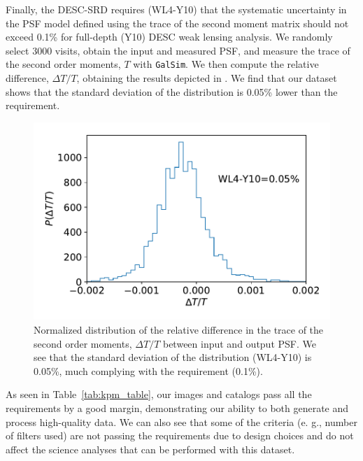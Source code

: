 \documentclass[twocolumn]{aastex62}
\begin{document}
Finally, the DESC-SRD requires (WL4-Y10) that the systematic uncertainty in the PSF model defined using the trace of the second moment matrix should not exceed 0.1\% for full-depth (Y10) DESC weak lensing analysis. We randomly select 3000 visits, obtain the input and measured PSF, and measure the trace of the second order moments, $T$ with \texttt{GalSim}. We then compute the relative difference, $\Delta T/T$, obtaining the results depicted in . We find that our dataset shows that the standard deviation of the distribution is 0.05\% lower than the requirement.
\begin{figure}
\centering
\includegraphics[width=0.9\columnwidth]{WL4-Y10}
\caption{Normalized distribution of the relative difference in the trace of the second order moments, $\Delta T/T$ between input and output PSF. We see that the standard deviation of the distribution (WL4-Y10) is 0.05\%, much complying with the requirement (0.1\%).}
\label{fig:WL4-Y10}
\end{figure}

As seen in Table~\ref{tab:kpm_table}, our images and catalogs pass all the requirements by a good margin, demonstrating our ability to both generate and process high-quality data. We can also see that some of the criteria (e. g., number of filters used) are not passing the requirements due to design choices and do not affect the science analyses that can be performed with this dataset.
\end{document}
